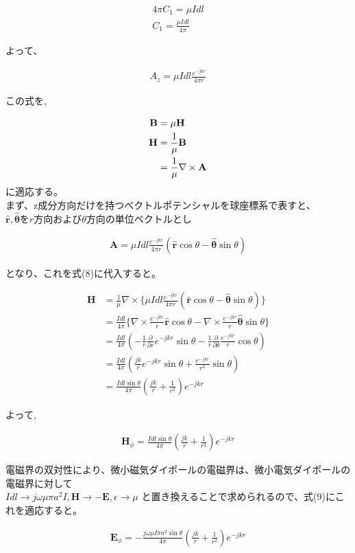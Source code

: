 \documentclass[dvipdfmx,autodetect-engine,titlepage]{jsarticle}
\begin{document}
\begin{align*}
  4\pi C_1 = \mu Idl\\
  C_1 = \frac{\mu Idl}{4\pi}
\end{align*}

よって、

\begin{align*}
  A_z = \mu Idl\frac{e^{-jkr}}{4\pi r}
\end{align*}

この式を,

\begin{align}
  \mathbf{B} &= \mu\mathbf{H}\notag\\
  \mathbf{H} &= \frac{1}{\mu}\mathbf{B}\notag\\
  &= \frac{1}{\mu}\nabla \times \mathbf{A}
\end{align}
に適応する。\\
まず、z成分方向だけを持つベクトルポテンシャルを球座標系で表すと、
\begin{math}\mathbf{\hat{r}},\boldsymbol{\hat{\theta}}
をr方向および\theta 方向の単位ベクトルとし\end{math}

\begin{align*}
    \mathbf{A} = \mu Idl\frac{e^{-jkr}}{4\pi r}(\mathbf{\hat{r}}\cos\theta - \boldsymbol{\hat{\theta}}\sin\theta)
\end{align*}

となり、これを式(8)に代入すると。

\begin{align*}
  \mathbf{H} &= \frac{1}{\mu}\nabla\times \{ \mu Idl\frac{e^{-jkr}}{4\pi r}(\mathbf{\hat{r}}\cos\theta - \boldsymbol{\hat{\theta}}\sin\theta)\} \\
  &= \frac{Idl}{4\pi}\{\nabla\times\frac{e^{-jkr}}{r}\mathbf{\hat{r}}\cos\theta - \nabla\times\frac{e^{-jkr}}{r}\boldsymbol{\hat{\theta}}\sin\theta\} \\
  &= \frac{Idl}{4\pi}(-\frac{1}{r}\frac{\partial}{\partial r}e^{-jkr}\sin\theta - \frac{1}{r}\frac{\partial}{\partial\theta}\frac{e^{-jkr}}{r}\cos\theta)\\
  &= \frac{Idl}{4\pi}(\frac{jk}{r}e^{-jkr}\sin\theta + \frac{e^{-jkr}}{r^2}\sin\theta)\\
  &= \frac{Idl\sin\theta}{4\pi}(\frac{jk}{r}+\frac{1}{r^2})e^{-jkr}
\end{align*}

よって,

\begin{align}
  \mathbf{H}_\phi = \frac{Idl\sin\theta}{4\pi}(\frac{jk}{r}+\frac{1}{r^2})e^{-jkr}
\end{align}

電磁界の双対性により、微小磁気ダイポールの電磁界は、微小電気ダイポールの電磁界に対して\\
\begin{math}
  Idl\rightarrow j\omega\mu\pi a^2 I , \mathbf{H} \rightarrow -\mathbf{E} , \epsilon \rightarrow \mu
\end{math}
と置き換えることで求められるので、式(9)にこれを適応すると。

\begin{align}
  \mathbf{E}_\phi = -\frac{j\omega\mu I\pi a^2 \sin\theta}{4\pi}(\frac{jk}{r}+\frac{1}{r^2})e^{-jkr}
\end{align}
\end{document}
